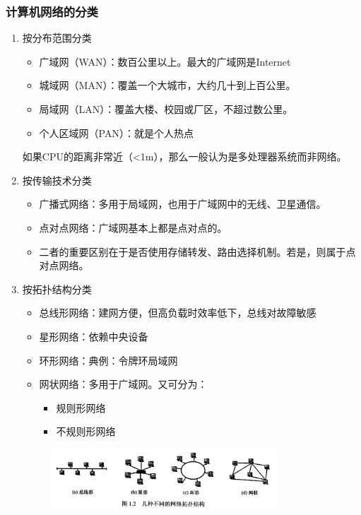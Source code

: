 \documentclass[12pt, a4paper, oneside]{ctexart}
\begin{document}
\subsubsection{计算机网络的分类}

\begin{enumerate}
    \item 按分布范围分类
    \begin{itemize}
        \item 广域网（WAN）：数百公里以上。最大的广域网是Internet
        \item 城域网（MAN）：覆盖一个大城市，大约几十到上百公里。
        \item 局域网（LAN）：覆盖大楼、校园或厂区，不超过数公里。
        \item 个人区域网（PAN）：就是个人热点
    \end{itemize}
    如果CPU的距离非常近（<1m），那么一般认为是多处理器系统而非网络。
    \item 按传输技术分类
    \begin{itemize}
        \item 广播式网络：多用于局域网，也用于广域网中的无线、卫星通信。
        \item 点对点网络：广域网基本上都是点对点的。
        \item 二者的重要区别在于是否使用存储转发、路由选择机制。若是，则属于点对点网络。
    \end{itemize}
    \item 按拓扑结构分类
    \begin{itemize}
        \item 总线形网络：建网方便，但高负载时效率低下，总线对故障敏感
        \item 星形网络：依赖中央设备
        \item 环形网络：典例：令牌环局域网
        \item 网状网络：多用于广域网。又可分为：
        \begin{itemize}
            \item 规则形网络
            \item 不规则形网络
        \end{itemize}
    \end{itemize}
    \begin{figure}
        \centering
        \includegraphics[width=0.8\textwidth]{./images/topo_structures.png}

\end{figure}
\end{enumerate}
\end{document}
